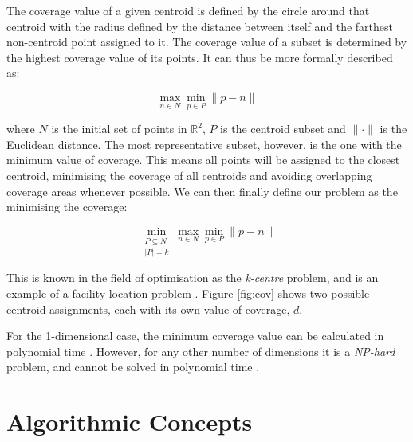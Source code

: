 The coverage value of a given centroid is defined by the circle around that centroid with the radius defined by the distance between itself and the farthest non-centroid point assigned to it. The coverage value of a subset is determined by the highest coverage value of its points. It can thus be more formally described as:

\begin{equation}
\max_{n \in N}
	{\min_{p \in P}
		{\lVert p-n \rVert}
	}
\end{equation}

\noindent
where $N$ is the initial set of points in $\mathbb{R}^2$, $P$ is the centroid subset and $\lVert \cdot \rVert $ is the Euclidean distance.
The most representative subset, however, is the one with the minimum value of coverage. This means all points will be assigned to the closest centroid, minimising the coverage of all centroids and avoiding overlapping coverage areas whenever possible.
We can then finally define our problem as the minimising the coverage:

\begin{equation}
\min_{\substack{P \subseteq N\\ \lvert P \rvert = k}}{\max_{n \in N}{\min_{p \in P}{\lVert p-n \rVert}}}
\end{equation}

This is known in the field of optimisation as the \emph{k-centre} problem, and is an example of a facility location problem \cite{thisfref}. Figure \ref{fig:cov} shows two possible centroid assignments, each with its own value of coverage, $d$.



For the 1-dimensional case, the minimum coverage value can be calculated in polynomial time \cite{dvaz}. However, for any other number of dimensions it is a \emph{NP-hard} problem, and cannot be solved in polynomial time \cite{complex}.

\section{Algorithmic Concepts}
